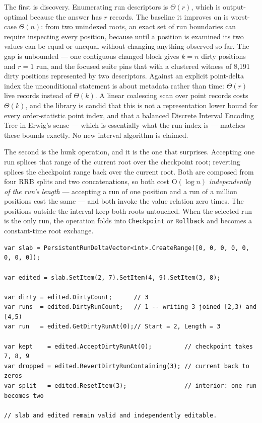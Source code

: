 \documentclass[11pt,twoside,openright]{book}
\newcommand{\code}[1]{\texorpdfstring{\textcolor{d7ink}{\texttt{#1}}}{#1}}
\newcommand{\bigoh}[1]{$\mathrm{O}(#1)$}
\begin{document}
The first is discovery. Enumerating run descriptors is $\Theta(r)$, which is
output-optimal because the answer has $r$ records. The baseline it improves on
is worst-case $\Theta(n)$: from two unindexed roots, an exact set of run
boundaries can require inspecting every position, because until a position is
examined its two values can be equal or unequal without changing anything
observed so far. The gap is unbounded --- one contiguous changed block gives
$k = n$ dirty positions and $r = 1$ run, and the focused suite pins that with a
clustered witness of 8{,}191 dirty positions represented by two descriptors.
Against an explicit point-delta index the unconditional statement is about
metadata rather than time: $\Theta(r)$ live records instead of $\Theta(k)$. A
linear coalescing scan over point records costs $\Theta(k)$, and the library is
candid that this is not a representation lower bound for every order-statistic
point index, and that a balanced Discrete Interval Encoding Tree in Erwig's
sense --- which is essentially what the run index is --- matches these bounds
exactly. No new interval algorithm is claimed.

The second is the hunk operation, and it is the one that surprises. Accepting
one run splices that range of the current root over the checkpoint root;
reverting splices the checkpoint range back over the current root. Both are
composed from four RRB splits and two concatenations, so both cost
\bigoh{\log n} \emph{independently of the run's length} --- accepting a run of
one position and a run of a million positions cost the same --- and both invoke
the value relation zero times. The positions outside the interval keep both
roots untouched. When the selected run is the only run, the operation folds into
\code{Checkpoint} or \code{Rollback} and becomes a constant-time root exchange.

\begin{lstlisting}[language={[Sharp]C}]
var slab = PersistentRunDeltaVector<int>.CreateRange([0, 0, 0, 0, 0, 0, 0, 0]);

var edited = slab.SetItem(2, 7).SetItem(4, 9).SetItem(3, 8);

var dirty = edited.DirtyCount;      // 3
var runs  = edited.DirtyRunCount;   // 1 -- writing 3 joined [2,3) and [4,5)
var run   = edited.GetDirtyRunAt(0);// Start = 2, Length = 3

var kept    = edited.AcceptDirtyRunAt(0);         // checkpoint takes 7, 8, 9
var dropped = edited.RevertDirtyRunContaining(3); // current back to zeros
var split   = edited.ResetItem(3);                // interior: one run becomes two

// slab and edited remain valid and independently editable.
\end{lstlisting}
\end{document}
